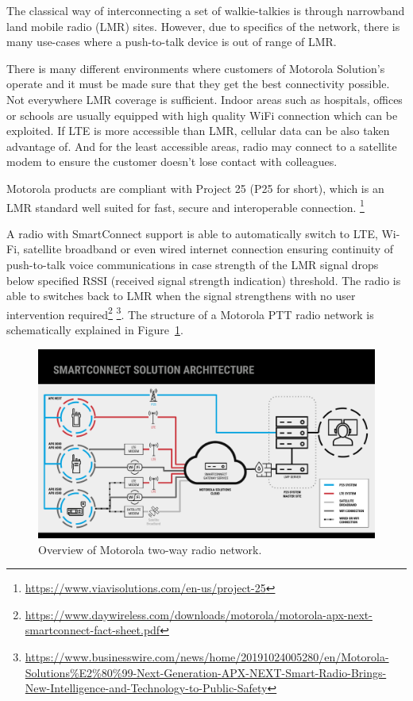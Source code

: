 The classical way of interconnecting a set of walkie-talkies is through narrowband land mobile radio (LMR) sites.
However, due to specifics of the network, there is many use-cases where a push-to-talk device is out of range of LMR. 

There is many different environments where customers of Motorola Solution's operate and it must be made sure that they get the best connectivity possible. Not everywhere LMR coverage is sufficient.  Indoor areas such as hospitals, offices or schools are usually equipped with high quality WiFi connection which can be exploited. If LTE is more accessible than LMR, cellular data can be also taken advantage of. And for the least accessible areas, radio may connect to a satellite modem to ensure the customer doesn't lose contact with colleagues. 

Motorola products are compliant with Project 25 (P25 for short), which is an LMR standard well suited for fast, secure and interoperable connection. \footnote{\url{https://www.viavisolutions.com/en-us/project-25}}

A radio with SmartConnect support is able to automatically switch to LTE, Wi-Fi, satellite broadband or even wired internet connection ensuring continuity of push-to-talk voice communications in case strength of the LMR signal drops below specified RSSI (received signal strength indication) threshold. 
The radio is able to switches back to LMR when the signal strengthens with no user intervention required\footnote{\url{https://www.daywireless.com/downloads/motorola/motorola-apx-next-smartconnect-fact-sheet.pdf}}
\footnote{\url{https://www.businesswire.com/news/home/20191024005280/en/Motorola-Solutions\%E2\%80\%99-Next-Generation-APX-NEXT-Smart-Radio-Brings-New-Intelligence-and-Technology-to-Public-Safety}}.
The structure of a Motorola PTT radio network is schematically explained in Figure~\ref{smart-connect:smart-connect-architecture}.

\begin{figure}[h]
    \centering
    \includegraphics[width=\textwidth]{img/motorola-smart-connect-architecture.pdf}
    \caption{Overview of Motorola two-way radio network.}
    \label{smart-connect:smart-connect-architecture}
\end{figure}

